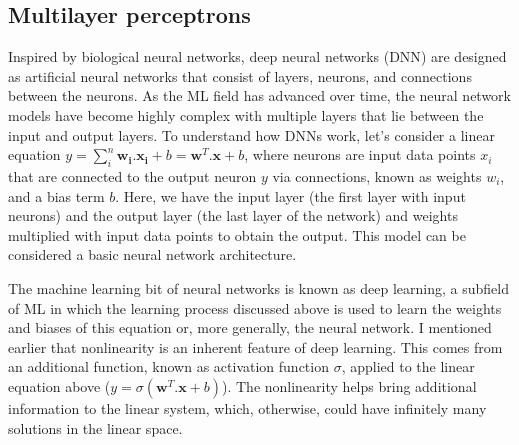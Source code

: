 \subsection{Multilayer perceptrons}

Inspired by biological neural networks, deep neural networks (\gls{DNN}) are designed as artificial neural networks that consist of layers, neurons, and connections between the neurons. As the \gls{ML} field has advanced over time, the neural network models have become highly complex with multiple layers that lie between the input and output layers. To understand how \gls{DNN}s work, let's consider a linear equation $y = \sum^n_i\mathbf{w_i} . \mathbf{x_i} + b = \mathbf{w}^T . \mathbf{x} + b$, where neurons are input data points $x_i$ that are connected to the output neuron $y$ via connections, known as weights $w_i$, and a bias term $b$. Here, we have the input layer (the first layer with input neurons) and the output layer (the last layer of the network)  and weights multiplied with input data points to obtain the output. This model can be considered a basic neural network architecture. 


The machine learning bit of neural networks is known as deep learning, a subfield of \gls{ML} in which the learning process discussed above is used to learn the weights and biases of this equation or, more generally, the neural network. I mentioned earlier that nonlinearity is an inherent feature of deep learning. This comes from an additional function, known as activation function $\sigma$, applied to the linear equation above ($y = \sigma(\mathbf{w} ^T. \mathbf{x} + b)$). The nonlinearity helps bring additional information to the linear system, which, otherwise, could have infinitely many solutions in the linear space.


